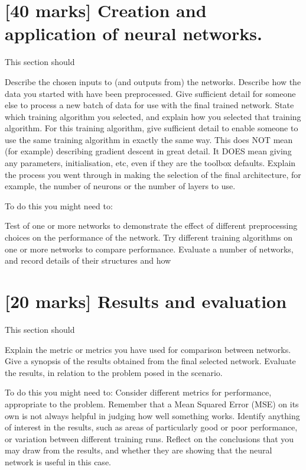 \documentclass[11pt,a4paper]{article}
\begin{document}
\section{[40 marks] Creation and application of neural networks.}
This section should
\begin{outline}
  \1 Describe the chosen inputs to (and outputs from) the networks.
  \1 Describe how the data you started with have been preprocessed.
  \1 Give sufficient detail for someone else to process a new batch of data for use with the final trained network.
  \1 State which training algorithm you selected, and explain how you selected that training algorithm. For this training algorithm, give sufficient detail to enable someone to use the same training algorithm in exactly the same way. This does NOT mean (for example) describing gradient descent in great detail. It DOES mean giving any parameters, initialisation, etc, even if they are the toolbox defaults.
  \1 Explain the process you went through in making the selection of the final architecture, for example, the number of neurons or the number of layers to use.
\end{outline}


To do this you might need to:
\begin{outline}
  \1 Test of one or more networks to demonstrate the effect of different preprocessing choices on the performance of the network.
  \1 Try different training algorithms on one or more networks to compare performance.
  \1 Evaluate a number of networks, and record details of their structures and how
\end{outline}

\section{[20 marks] Results and evaluation}
This section should
\begin{outline}
  \1 Explain the metric or metrics you have used for comparison between networks.
  \1 Give a synopsis of the results obtained from the final selected network.
  \1 Evaluate the results, in relation to the problem posed in the scenario. 
\end{outline}
\begin{outline}
To do this you might need to:
  \1 Consider different metrics for performance, appropriate to the problem. Remember that a Mean Squared Error (MSE) on its own is not always helpful in judging how well something works.
  \1 Identify anything of interest in the results, such as areas of particularly good or poor performance, or variation between different training runs.
  \1 Reflect on the conclusions that you may draw from the results, and whether they are showing that the neural network is useful in this case.
\end{outline}
\end{document}
